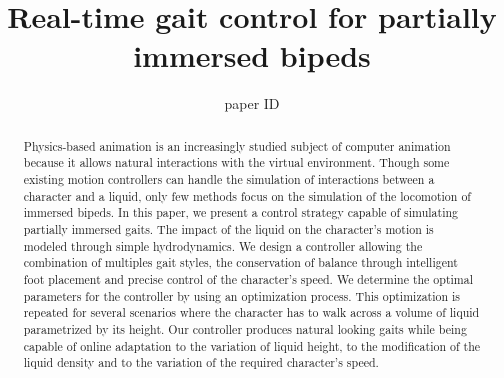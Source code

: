 \documentclass[conference]{acmsiggraph}
\title{Real-time gait control for partially immersed bipeds}
\author{paper ID}
\begin{document}

\maketitle

\begin{abstract}

Physics-based animation is an increasingly studied subject of computer animation because it allows natural interactions with the virtual environment. Though some existing motion controllers can handle the simulation of interactions between a character and a liquid, only few methods focus on the simulation of the locomotion of immersed bipeds. In this paper, we present a control strategy capable of simulating partially immersed gaits. The impact of the liquid on the character's motion is modeled through simple hydrodynamics. We design a controller allowing the combination of multiples gait styles, the conservation of balance through intelligent foot placement and precise control of the character's speed. We determine the optimal parameters for the controller by using an optimization process. This optimization is repeated for several scenarios where the character has to walk across a volume of liquid parametrized by its height. Our controller produces natural looking gaits while being capable of online adaptation to the variation of liquid height, to the modification of the liquid density and to the variation of the required character's speed.

\end{abstract}

\begin{CRcatlist}
\end{CRcatlist}
\end{document}
